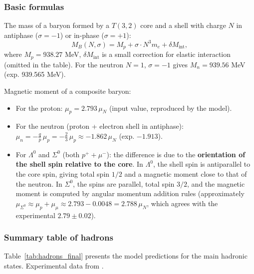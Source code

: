 \documentclass[11pt,a4paper]{article}
\begin{document}
\subsubsection{Basic formulas}
The mass of a baryon formed by a $T(3,2)$ core and a shell with charge $N$ in antiphase ($\sigma=-1$) or in-phase ($\sigma=+1$):
\begin{equation}
M_{B}(N,\sigma) = M_p + \sigma\cdot N^3 m_e + \delta M_{\text{int}},
\end{equation}
where $M_p = 938.27$ MeV, $\delta M_{\text{int}}$ is a small correction for elastic interaction (omitted in the table). For the neutron $N=1$, $\sigma=-1$ gives $M_n = 939.56$ MeV (exp. 939.565 MeV).

Magnetic moment of a composite baryon:
\begin{itemize}
\item For the proton: $\mu_p = 2.793\,\mu_N$ (input value, reproduced by the model).
\item For the neutron (proton + electron shell in antiphase): $\mu_n = -\frac{q}{p}\,\mu_p = -\frac{2}{3}\,\mu_p \approx -1.862\,\mu_N$ (exp. $-1.913$).
\item For $\Lambda^0$ and $\Sigma^0$ (both $p^+ + \mu^-$): the difference is due to the \textbf{orientation of the shell spin relative to the core}. In $\Lambda^0$, the shell spin is antiparallel to the core spin, giving total spin $1/2$ and a magnetic moment close to that of the neutron. In $\Sigma^0$, the spins are parallel, total spin $3/2$, and the magnetic moment is computed by angular momentum addition rules (approximately $\mu_{\Sigma^0} \approx \mu_p + \mu_\mu \approx 2.793 - 0.0048 = 2.788\,\mu_N$, which agrees with the experimental $2.79\pm0.02$).
\end{itemize}

\subsubsection{Summary table of hadrons}
Table~\ref{tab:hadrons_final} presents the model predictions for the main hadronic states. Experimental data from \cite{PDG:2024}.
\end{document}

